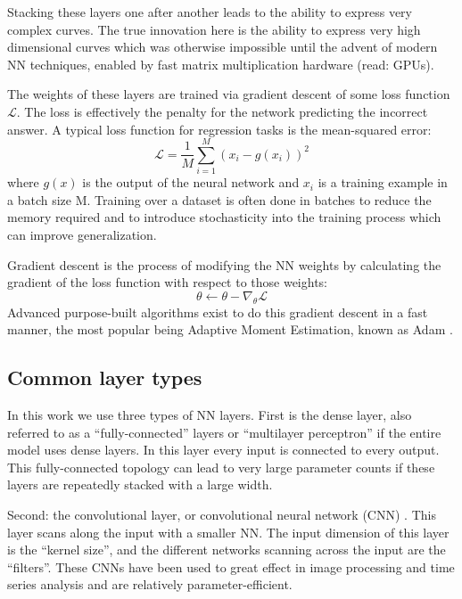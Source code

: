 Stacking these layers one after another leads to the ability to express very complex curves. The true innovation here is the ability to express very high dimensional curves which was otherwise impossible until the advent of modern NN techniques, enabled by fast matrix multiplication hardware (read: GPUs).

The weights of these layers are trained via gradient descent of some loss function $\mathcal{L}$. The loss is effectively the penalty for the network predicting the incorrect answer. A typical loss function for regression tasks is the mean-squared error: 
\begin{equation}
	\mathcal{L} = \frac{1}{M} \sum_{i=1}^M (x_i - g(x_i))^2
\end{equation}
where $g(x)$ is the output of the neural network and $x_i$ is a training example in a batch size M. Training over a dataset is often done in batches to reduce the memory required and to introduce stochasticity into the training process which can improve generalization. 

Gradient descent is the process of modifying the NN weights by calculating the gradient of the loss function with respect to those weights:
\begin{equation}
	\theta \gets \theta - \nabla_\theta \mathcal{L}
\end{equation}
Advanced purpose-built algorithms exist to do this gradient descent in a fast manner, the most popular being Adaptive Moment Estimation, known as Adam  \cite{kingma_adam_2017}. 


\subsection{Common layer types}

In this work we use three types of NN layers. First is the dense layer, also referred to as a ``fully-connected'' layers or ``multilayer perceptron'' if the entire model uses dense layers. In this layer every input is connected to every output. This fully-connected topology can lead to very large parameter counts if these layers are repeatedly stacked with a large width.

Second: the convolutional layer, or convolutional neural network (CNN) \cite{lecun_convolutional_1995}. This layer scans along the input with a smaller NN. The input dimension of this layer is the ``kernel size'', and the different networks scanning across the input are the ``filters''. These CNNs have been used to great effect in image processing and time series analysis and are relatively parameter-efficient.

